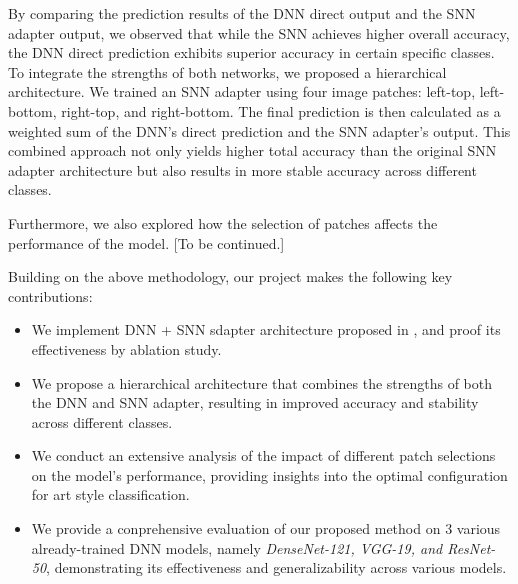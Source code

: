 By comparing the prediction results of the DNN direct output and the SNN adapter output, we observed that while the SNN achieves higher overall accuracy, the DNN direct prediction exhibits superior accuracy in certain specific classes. To integrate the strengths of both networks, we proposed a hierarchical architecture. We trained an SNN adapter using four image patches: left-top, left-bottom, right-top, and right-bottom. The final prediction is then calculated as a weighted sum of the DNN's direct prediction and the SNN adapter's output. This combined approach not only yields higher total accuracy than the original SNN adapter architecture but also results in more stable accuracy across different classes.

Furthermore, we also explored how the selection of patches affects the performance of the model. [To be continued.]

Building on the above methodology, our project makes the following key contributions: 
\begin{itemize}
    \item We implement DNN + SNN sdapter architecture proposed in \cite{imran2023artistic}, and proof its effectiveness by ablation study.
    \item We propose a hierarchical architecture that combines the strengths of both the DNN and SNN adapter, resulting in improved accuracy and stability across different classes.
    \item We conduct an extensive analysis of the impact of different patch selections on the model's performance, providing insights into the optimal configuration for art style classification.
    \item We provide a conprehensive evaluation of our proposed method on 3 various already-trained DNN models, namely \textit{DenseNet-121, VGG-19, and ResNet-50}, demonstrating its effectiveness and generalizability across various models.
\end{itemize}
